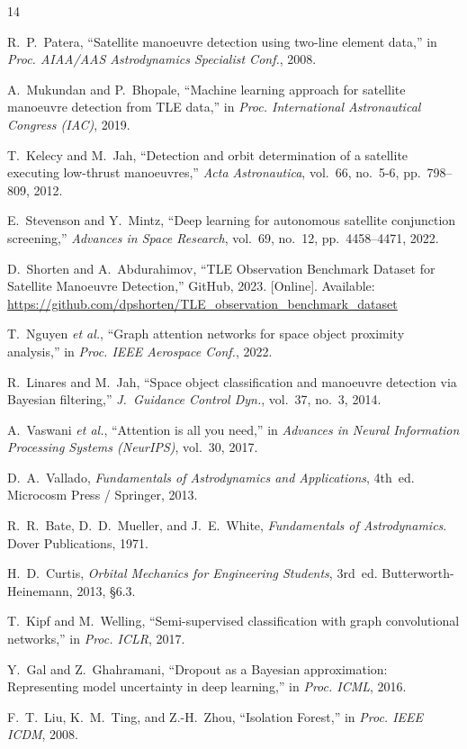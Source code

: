 \documentclass[conference]{IEEEtran}
\begin{document}

\begin{thebibliography}{14}

R.~P.~Patera, ``Satellite manoeuvre detection using two-line element data,''
in \textit{Proc. AIAA/AAS Astrodynamics Specialist Conf.}, 2008.

A.~Mukundan and P.~Bhopale, ``Machine learning approach for satellite
manoeuvre detection from TLE data,'' in \textit{Proc. International
Astronautical Congress (IAC)}, 2019.

T.~Kelecy and M.~Jah, ``Detection and orbit determination of a satellite
executing low-thrust manoeuvres,'' \textit{Acta Astronautica}, vol.~66,
no.~5-6, pp.~798--809, 2012.

E.~Stevenson and Y.~Mintz, ``Deep learning for autonomous satellite
conjunction screening,'' \textit{Advances in Space Research}, vol.~69,
no.~12, pp.~4458--4471, 2022.

D.~Shorten and A.~Abdurahimov, ``TLE Observation Benchmark Dataset for
Satellite Manoeuvre Detection,'' GitHub, 2023.
[Online]. Available: \url{https://github.com/dpshorten/TLE_observation_benchmark_dataset}

T.~Nguyen \textit{et al.}, ``Graph attention networks for space object
proximity analysis,'' in \textit{Proc. IEEE Aerospace Conf.}, 2022.

R.~Linares and M.~Jah, ``Space object classification and manoeuvre
detection via Bayesian filtering,'' \textit{J.~Guidance Control Dyn.},
vol.~37, no.~3, 2014.

A.~Vaswani \textit{et al.}, ``Attention is all you need,'' in
\textit{Advances in Neural Information Processing Systems (NeurIPS)},
vol.~30, 2017.

D.~A.~Vallado, \textit{Fundamentals of Astrodynamics and Applications},
4th~ed. Microcosm Press / Springer, 2013.

R.~R.~Bate, D.~D.~Mueller, and J.~E.~White, \textit{Fundamentals of
Astrodynamics}. Dover Publications, 1971.

H.~D.~Curtis, \textit{Orbital Mechanics for Engineering Students},
3rd~ed. Butterworth-Heinemann, 2013, \S6.3.

T.~Kipf and M.~Welling, ``Semi-supervised classification with graph
convolutional networks,'' in \textit{Proc. ICLR}, 2017.

Y.~Gal and Z.~Ghahramani, ``Dropout as a Bayesian approximation:
Representing model uncertainty in deep learning,'' in
\textit{Proc. ICML}, 2016.

F.~T.~Liu, K.~M.~Ting, and Z.-H.~Zhou, ``Isolation Forest,'' in
\textit{Proc. IEEE ICDM}, 2008.

\end{thebibliography}
\end{document}
